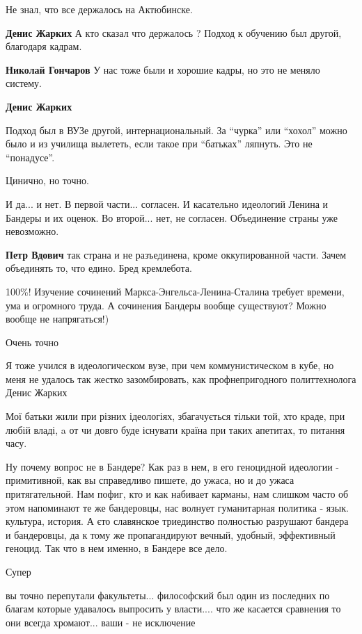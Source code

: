 \begin{itemize}
Не знал, что все держалось на Актюбинске.

\begin{itemize} %
\textbf{Денис Жарких} А кто сказал что держалось ? Подход к обучению был другой, благодаря кадрам.

\textbf{Николай Гончаров} У нас тоже были и хорошие кадры, но это не меняло систему.

\textbf{Денис Жарких} 

Подход был в ВУЗе другой, интернациональный. За \enquote{чурка} или \enquote{хохол} можно было
и из училища вылететь, если такое при \enquote{батьках} ляпнуть. Это не \enquote{понадусе}.

\end{itemize} %

Цинично, но точно.

И да... и нет.
В первой части... согласен. И касательно идеологий Ленина и Бандеры и их оценок.
Во второй... нет, не согласен. Объединение страны уже невозможно.

\textbf{Петр Вдович} так страна и не разъединена, кроме оккупированной части. Зачем объединять то, что едино. Бред кремлебота.


100\%! Изучение сочинений Маркса-Энгельса-Ленина-Сталина требует времени, ума и
огромного труда. А сочинения Бандеры вообще существуют? Можно вообще не
напрягаться!)


Очень точно


Я тоже учился в идеологическом вузе, при чем коммунистическом в кубе, но меня
не удалось так жестко зазомбировать, как профнепригодного политтехнолога Денис
Жарких


Мої батьки жили при різних ідеологіях, збагачується тільки той, хто краде, при
любій владі, a от чи довго буде існувати країна при таких апетитах, то питання
часу.


Ну почему вопрос не в Бандере? Как раз в нем, в его геноцидной идеологии -
примитивной, как вы справедливо пишете, до ужаса, но и до ужаса притягательной.
Нам пофиг, кто и как набивает карманы, нам слишком часто об этом напоминают те
же бандеровцы, нас волнует гуманитарная политика - язык. культура, история. А
єто славянское триединство полностью разрушают бандера и бандеровцы, да к тому
же пропагандируют вечный, удобный, эффективный геноцид. Так что в нем именно, в
Бандере все дело.

Супер


вы точно перепутали факультеты... философский был один из последних по благам
которые удавалось выпросить у власти.... что же касается сравнения то они
всегда хромают... ваши - не исключение

\end{itemize} %
